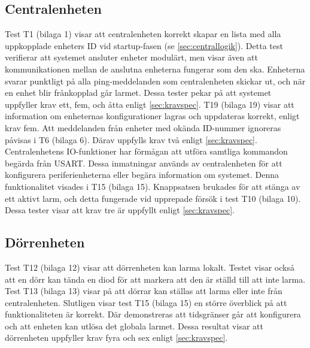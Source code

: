 \subsection{Centralenheten}
Test T1 (bilaga 1) visar att centralenheten korrekt skapar en lista med alla uppkopplade enheters ID vid startup-fasen (se \ref{sec:centrallogik}). Detta test verifierar att systemet ansluter enheter modulärt, men visar även att kommunikationen mellan de anslutna enheterna fungerar som den ska. Enheterna svarar punktligt på alla ping-meddelanden som centralenheten skickar ut, och när en enhet blir frånkopplad går larmet. Dessa tester pekar på att systemet uppfyller krav ett, fem, och åtta enligt \ref{sec:kravspec}. 
\newline \newline 
T19 (bilaga 19) visar att information om enheternas konfigurationer lagras och uppdateras korrekt, enligt krav fem. Att meddelanden från enheter med okända ID-nummer ignoreras påvisas i T6 (bilaga 6). Därav uppfylls krav två enligt \ref{sec:kravspec}. 
\newline \newline
Centralenhetens IO-funktioner har förmågan att utföra samtliga kommandon begärda från USART. Dessa inmatningar används av centralenheten för att konfigurera periferienheterna eller begära information om systemet. Denna funktionalitet visades i T15 (bilaga 15). Knappsatsen brukades för att stänga av ett aktivt larm, och detta fungerade vid upprepade försök i test T10 (bilaga 10). Dessa tester visar att krav tre är uppfyllt enligt \ref{sec:kravspec}.

\subsection{Dörrenheten}
Test T12 (bilaga 12) visar att dörrenheten kan larma lokalt. Testet visar också att en dörr kan tända en diod för att markera att den är ställd till att inte larma. Test T13 (bilaga 13) visar på att dörrar kan ställas att larma eller inte från centralenheten. Slutligen visar test T15 (bilaga 15) en större överblick på att funktionaliteten är korrekt. Där demonstreras att tidsgränser går att konfigurera och att enheten kan utlösa det globala larmet. Dessa resultat visar att dörrenheten uppfyller krav fyra och sex enligt \ref{sec:kravspec}.


